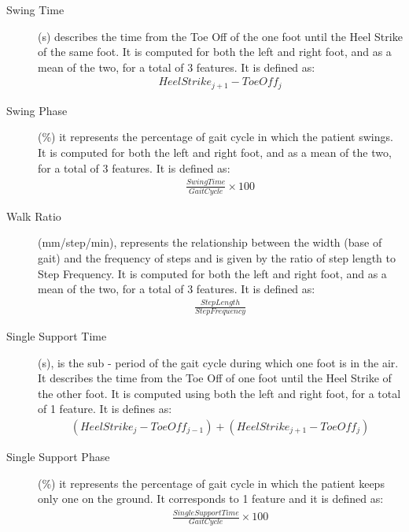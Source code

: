 \begin{description}
\item[Swing Time] 
 (s) describes the time from the Toe Off of the one foot until the Heel Strike of the same foot. It is computed for both the left and right foot, and as a mean of the two, for a total of 3 features. It is defined as:
\begin{equation}
\begin{aligned}
Heel Strike_{j+1}-Toe Off_{j}
\end{aligned}
\end{equation}

\item[Swing Phase] (\%) it represents the percentage of gait cycle in which the patient swings. It is computed for both the left and right foot, and as a mean of the two, for a total of 3 features. It is defined as:
\begin{equation}
\begin{aligned}
\frac{Swing Time}{Gait Cycle} \times 100
\end{aligned}
\end{equation}


\item[Walk Ratio]
(mm/step/min), represents the relationship between the width (base of gait) and the frequency of steps and is given by the ratio of step length to Step Frequency. It is computed for both the left and right foot, and as a mean of the two, for a total of 3 features. It is defined as:
\begin{equation}
\begin{aligned}
\frac{Step Length}{Step Frequency}
\end{aligned}
\end{equation}


\item[Single Support Time] 
(s), is the sub - period of the gait cycle during which one foot is in the air. It describes the time from the Toe Off of one foot until the Heel Strike of the other foot. It is computed using both the left and right foot, for a total of 1 feature. It is defines as:
\begin{equation}
\begin{aligned}
(Heel Strike_j - Toe Off_{j-1}) + (Heel Strike_{j+1} - Toe Off_{j})
\end{aligned}
\end{equation}

\item[Single Support Phase] (\%) it represents the percentage of gait cycle in which the patient keeps only one on the ground.  It corresponds to 1 feature and it is defined as:
\begin{equation}
\begin{aligned}
\frac{Single Support Time}{Gait Cycle} \times 100
\end{aligned}
\end{equation}



\end{description}
